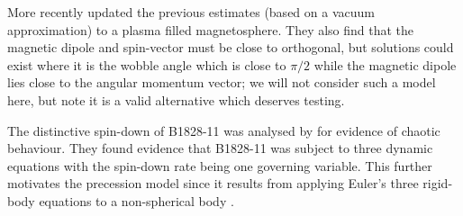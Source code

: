 \documentclass[../full_thesis/full_thesis.tex]{subfiles}
\begin{document}

More recently \citet{Arzamasskiy2015} updated the previous estimates (based on
a vacuum approximation) to a plasma filled magnetosphere. They also find that
the magnetic dipole and spin-vector must be close to orthogonal, but solutions
could exist where it is the wobble angle which is close to $\pi/2$ while the
magnetic dipole lies close to the angular momentum vector; we will not consider
such a model here, but note it is a valid alternative which deserves testing.

The distinctive spin-down of B1828-11 was analysed by \citet{Seymour2013} for
evidence of chaotic behaviour. They found evidence that B1828-11 was subject to
three dynamic equations with the spin-down rate being one governing variable.
This further motivates the precession model since it results from applying
Euler's three rigid-body equations to a non-spherical body \citep{Landau1969}.
\end{document}
